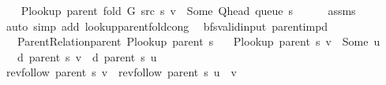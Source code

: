 \begin{isabellebody}
\ \ \isamarkupfalse%
\ {\isachardoublequoteopen}P{\isacharunderscore}{\kern0pt}lookup\ {\isacharparenleft}{\kern0pt}parent\ {\isacharparenleft}{\kern0pt}fold\ G\ src\ s{\isacharparenright}{\kern0pt}{\isacharparenright}{\kern0pt}\ v\ {\isacharequal}{\kern0pt}\ Some\ {\isacharparenleft}{\kern0pt}Q{\isacharunderscore}{\kern0pt}head\ {\isacharparenleft}{\kern0pt}queue\ s{\isacharparenright}{\kern0pt}{\isacharparenright}{\kern0pt}{\isachardoublequoteclose}\isanewline
\ \ \ \ \isamarkupfalse%
\ assms\isanewline
\ \ \ \ \isamarkupfalse%
\ {\isacharparenleft}{\kern0pt}auto\ simp\ add{\isacharcolon}{\kern0pt}\ lookup{\isacharunderscore}{\kern0pt}parent{\isacharunderscore}{\kern0pt}fold{\isacharunderscore}{\kern0pt}cong{\isacharparenright}{\kern0pt}\isanewline
{}\isamarkupfalse%
%
\endisatagproof
{\isafoldproof}%
%
\isadelimproof
\isanewline
%
\endisadelimproof
\isanewline
{}\isamarkupfalse%
\ {\isacharparenleft}{\kern0pt}\ bfs{\isacharunderscore}{\kern0pt}valid{\isacharunderscore}{\kern0pt}input{\isacharparenright}{\kern0pt}\ parent{\isacharunderscore}{\kern0pt}imp{\isacharunderscore}{\kern0pt}d{\isacharcolon}{\kern0pt}\isanewline
\ \ \ {\isachardoublequoteopen}Parent{\isacharunderscore}{\kern0pt}Relation{\isachardot}{\kern0pt}parent\ {\isacharparenleft}{\kern0pt}P{\isacharunderscore}{\kern0pt}lookup\ {\isacharparenleft}{\kern0pt}parent\ s{\isacharparenright}{\kern0pt}{\isacharparenright}{\kern0pt}{\isachardoublequoteclose}\isanewline
\ \ \ {\isachardoublequoteopen}P{\isacharunderscore}{\kern0pt}lookup\ {\isacharparenleft}{\kern0pt}parent\ s{\isacharparenright}{\kern0pt}\ v\ {\isacharequal}{\kern0pt}\ Some\ u{\isachardoublequoteclose}\isanewline
\ \ \ {\isachardoublequoteopen}d\ {\isacharparenleft}{\kern0pt}parent\ s{\isacharparenright}{\kern0pt}\ v\ {\isacharequal}{\kern0pt}\ d\ {\isacharparenleft}{\kern0pt}parent\ s{\isacharparenright}{\kern0pt}\ u\ {\isacharplus}{\kern0pt}\ {}{\isachardoublequoteclose}\isanewline
%
\isadelimproof
%
\endisadelimproof
%
\isatagproof
{}\isamarkupfalse%
\ {\isacharminus}{\kern0pt}\isanewline
\ \ \isamarkupfalse%
\ {\isachardoublequoteopen}rev{\isacharunderscore}{\kern0pt}follow\ {\isacharparenleft}{\kern0pt}parent\ s{\isacharparenright}{\kern0pt}\ v\ {\isacharequal}{\kern0pt}\ rev{\isacharunderscore}{\kern0pt}follow\ {\isacharparenleft}{\kern0pt}parent\ s{\isacharparenright}{\kern0pt}\ u\ {\isacharat}{\kern0pt}\ {\isacharbrackleft}{\kern0pt}v{\isacharbrackright}{\kern0pt}{\isachardoublequoteclose}\isanewline

\end{isabellebody}
